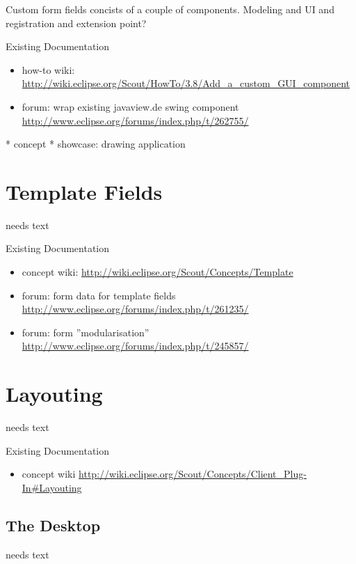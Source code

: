 \documentclass[a4paper,10pt,twoside]{book}
\begin{document}
{Custom form fields concists of a couple of components. Modeling and UI and registration and extension point?

\noindent Existing Documentation
\begin{itemize}
  \item how-to wiki: \url{http://wiki.eclipse.org/Scout/HowTo/3.8/Add_a_custom_GUI_component}
  \item forum: wrap existing javaview.de swing component \url{http://www.eclipse.org/forums/index.php/t/262755/}
\end{itemize}

  * concept
  * showcase: drawing application

\chapter{Template Fields}
needs text

\noindent Existing Documentation
\begin{itemize}
  \item concept wiki: \url{http://wiki.eclipse.org/Scout/Concepts/Template}
  \item forum: form data for template fields \url{http://www.eclipse.org/forums/index.php/t/261235/}
  \item forum: form ''modularisation'' \url{http://www.eclipse.org/forums/index.php/t/245857/}
\end{itemize}



\chapter{Layouting}
needs text

\noindent Existing Documentation
\begin{itemize}
  \item concept wiki \url{http://wiki.eclipse.org/Scout/Concepts/Client_Plug-In#Layouting}
\end{itemize}

\section{The Desktop}
needs text

}
\end{document}
